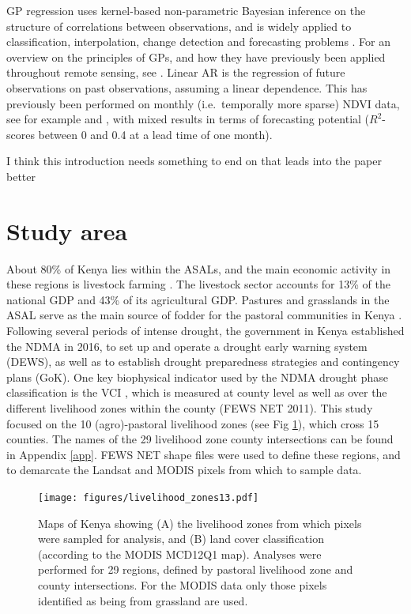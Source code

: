 \documentclass[review]{elsarticle}
\begin{document}
 GP regression uses kernel-based non-parametric Bayesian inference on the structure of correlations between observations, and is widely applied to classification, interpolation, change detection and forecasting problems \citep{955315,Chandola2010SCALABLETS,7487896,rs11050481}. For an overview on the principles of GPs, and how they have previously been applied throughout remote sensing, see \cite{7487896}. Linear AR is the regression of future observations on past observations, assuming a linear dependence. This has previously been performed on monthly (i.e.~temporally more sparse) NDVI data, see for example \cite{Asoka:2015} and \cite{Papagiannopoulou}, with mixed results in terms of forecasting potential ($R^2$-scores between 0 and 0.4 at a lead time of one month).  

{\color{red} I think this introduction needs something to end on that leads into the paper better}

\section{Study area}
About 80\% of Kenya lies within the ASALs, and the main economic activity in these regions is livestock farming \citep{UNDP2013,FAO2014}. The livestock sector accounts for 13\% of the national GDP and 43\% of its agricultural GDP. Pastures and grasslands in the ASAL serve as the main source of fodder for the pastoral communities in Kenya \citep{Behnke2011}. Following several periods of intense drought, the government in Kenya established the NDMA in 2016, to set up and operate a drought early warning system (DEWS), as well as to establish drought preparedness strategies and contingency plans (GoK). One key biophysical indicator used by the NDMA drought phase classification is the VCI \citep{rs8040267}, which is measured at county level as well as over the different livelihood zones within the county (FEWS NET 2011). This study focused on the 10 (agro)-pastoral livelihood zones (see Fig \ref{fig:l_zone}), which cross 15 counties. The names of the 29 livelihood zone county intersections can be found in Appendix \ref{app}. FEWS NET shape files were used to define these regions, and to demarcate the Landsat and MODIS pixels from which to sample data.




\begin{figure}
	\centering
	\texttt{[image: figures/livelihood\_zones13.pdf]} 
	\caption{Maps of Kenya showing (A) the livelihood zones from which pixels were sampled for analysis, and (B) land cover classification (according to the MODIS MCD12Q1 map). Analyses were performed for 29 regions, defined by pastoral livelihood zone and county intersections. For the MODIS data only those pixels identified as being from grassland are used.} \label{fig:l_zone}
\end{figure}
\end{document}
